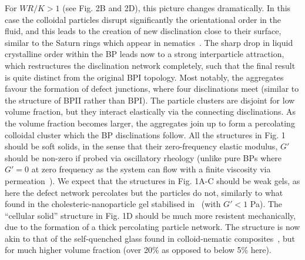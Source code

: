 \documentclass[12pt]{article}
\begin{document}
For $WR/K>1$ (see Fig. 2B and 2D), this picture changes dramatically.
In this case the colloidal particles disrupt significantly the
orientational order in the fluid, and this leads to the 
creation of new disclination close to their surface, similar 
to the Saturn rings which appear in nematics~\cite{stark}. The sharp drop in
liquid crystalline order within the BP leads now to a 
strong interparticle attraction, which restructures the disclination
network completely, such that the final result is quite distinct from
the original BPI topology. Most notably, the aggregates favour
the formation of defect junctions, where four disclinations meet
(similar to the structure of BPII rather than BPI). The 
particle clusters are disjoint for low volume fraction, but 
they interact elastically via the connecting disclinations.
As the volume fraction becomes larger, the aggregates join up
to form a percolating colloidal cluster which the BP disclinations
follow. All the structures in Fig. 1 should be soft solids, in
the sense that their zero-frequency elastic modulus, $G'$ should
be non-zero if probed via oscillatory rheology (unlike pure BPs where
$G'=0$ at zero frequency as the system can flow with a finite
viscosity via permeation~\cite{permeation1,permeation2}). We expect that the
structures in Fig. 1A-C should be weak gels, as here the 
defect network percolates but the particles do not, similarly
to what found in the cholesteric-nanoparticle gel stabilised
in~\cite{lubensky} (with $G'<1$ Pa). The ``cellular solid'' 
structure in Fig. 1D should be much more resistent mechanically, 
due to the formation of a thick percolating particle network. The 
structure is now akin to that of the self-quenched glass found in 
colloid-nematic composites~\cite{tiffany}, but for much higher volume 
fraction (over 20\% as opposed to below 5\% here). 
\end{document}
